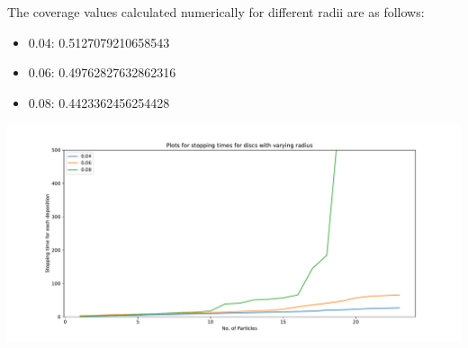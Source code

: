 \documentclass[a0paper,portrait]{baposter}
\begin{document}
\begin{poster}
{The coverage values calculated numerically for different radii are as follows: 
\begin{itemize}
\item 0.04: 0.5127079210658543
\item 0.06: 0.49762827632862316
\item 0.08: 0.4423362456254428
\end{itemize}

\vspace{-5pt}
\begin{center}
    \includegraphics[width=0.85\linewidth]{plot}
\end{center}
}


\end{poster}
\end{document}
